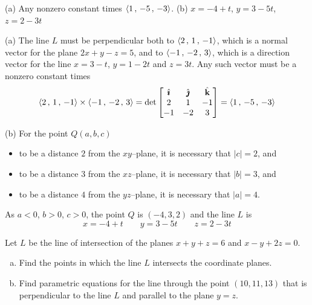 %

\begin{answer}
(a) Any nonzero constant times $\left< 1 \,,\, -5 \,,\, -3 \right>$.\qquad
(b) $x = -4 + t$, 
    $y = 3 - 5t$,
    $z = 2 - 3t$
\end{answer}

\begin{solution}
(a) The line $L$ must be perpendicular both to 
        $\left< 2\,,\,1\,,\,-1\right>$, which is a normal vector 
        for the plane $2x + y  - z = 5$,
and to
        $\left< -1\,,\,-2\,,\,3\right>$, which is a direction vector for
the line $x = 3 - t$, $y = 1 - 2t$ and $z = 3t$.
Any such vector must be a nonzero constant times
\begin{align*}
\left< 2\,,\,1\,,\,-1\right> \times \left< -1\,,\,-2\,,\,3\right>
    =\det\left[\begin{matrix}
            \hat{\pmb{\imath}}  &  \hat{\pmb{\jmath}}  &  \hat{\mathbf{k}} \\
            2    &   1   &    -1 \\
           -1    &  -2   &   3 
            \end{matrix}\right]
=\left< 1 \,,\, -5 \,,\, -3 \right>
\end{align*}

(b) For the point $Q(a, b, c)$
\begin{itemize}
\item
to be a distance $2$ from the $xy$--plane, it is necessary that $|c|=2$,
and
\item
to be a distance $3$ from the $xz$--plane, it is necessary that $|b|=3$,
and
\item
to be a distance $4$ from the $yz$--plane, it is necessary that $|a|=4$.
\end{itemize}
As $a < 0$, $b > 0$, $c > 0$, the point $Q$ is $(-4, 3, 2)$ and the line $L$
is
\begin{equation*}
x = -4 + t \qquad
y = 3 - 5t \qquad
z = 2 - 3t 
\end{equation*}
\end{solution}

\begin{question}[M200 2012D] %
Let $L$ be the line of intersection of the planes $x + y + z = 6$ and 
$x - y + 2z = 0$.
\begin{enumerate}[(a)]
\item
Find the points in which the line $L$ intersects the coordinate planes.
\item
Find parametric equations for the line through the point $(10, 11, 13)$ 
that is perpendicular to the line $L$ and parallel to the plane $y = z$.
\end{enumerate}
\end{question}

